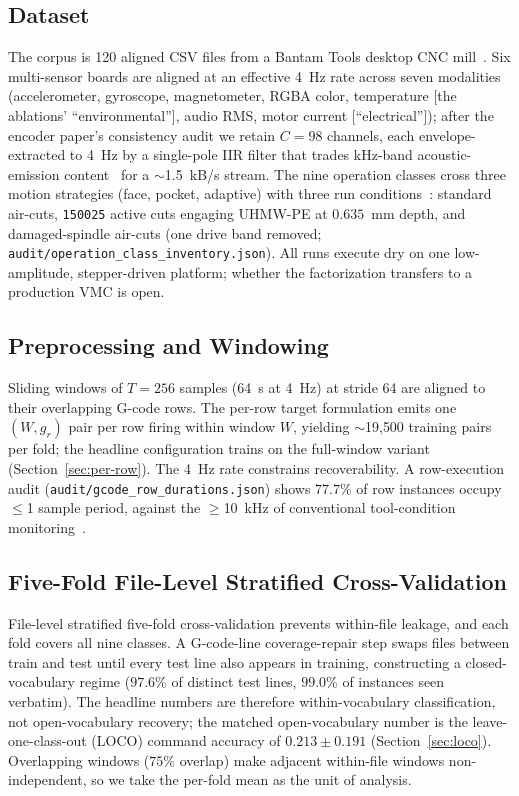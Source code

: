 \documentclass[conference]{IEEEtran}
\begin{document}
\subsection{Dataset}
\label{sec:dataset}

The corpus is 120 aligned CSV files from a Bantam Tools desktop CNC mill~\cite{encoder_paper}. Six multi-sensor boards are aligned at an effective 4~Hz rate across seven modalities (accelerometer, gyroscope, magnetometer, RGBA color, temperature [the ablations' ``environmental''], audio RMS, motor current [``electrical'']); after the encoder paper's consistency audit we retain $C=98$ channels, each envelope-extracted to 4~Hz by a single-pole IIR filter that trades kHz-band acoustic-emission content~\cite{teti2010advanced} for a $\sim$1.5~kB/s stream. The nine operation classes cross three motion strategies (face, pocket, adaptive) with three run conditions~\cite{encoder_paper}: standard air-cuts, \texttt{150025} active cuts engaging UHMW-PE at $0.635$~mm depth, and damaged-spindle air-cuts (one drive band removed; \texttt{audit/operation\_class\_inventory.json}). All runs execute dry on one low-amplitude, stepper-driven platform; whether the factorization transfers to a production VMC is open.

\subsection{Preprocessing and Windowing}
\label{sec:preprocessing}

Sliding windows of $T=256$ samples (64~s at 4~Hz) at stride 64 are aligned to their overlapping G-code rows. The per-row target formulation emits one $(W, g_r)$ pair per row firing within window $W$, yielding $\sim$19{,}500 training pairs per fold; the headline configuration trains on the full-window variant (Section~\ref{sec:per-row}). The 4~Hz rate constrains recoverability. A row-execution audit (\texttt{audit/gcode\_row\_durations.json}) shows $77.7\%$ of row instances occupy $\le$1 sample period, against the $\geq$10~kHz of conventional tool-condition monitoring~\cite{teti2010advanced}.

\subsection{Five-Fold File-Level Stratified Cross-Validation}
\label{sec:cv}

File-level stratified five-fold cross-validation prevents within-file leakage, and each fold covers all nine classes. A G-code-line coverage-repair step swaps files between train and test until every test line also appears in training, constructing a closed-vocabulary regime ($97.6\%$ of distinct test lines, $99.0\%$ of instances seen verbatim). The headline numbers are therefore within-vocabulary classification, not open-vocabulary recovery; the matched open-vocabulary number is the leave-one-class-out (LOCO) command accuracy of $0.213 \pm 0.191$ (Section~\ref{sec:loco}). Overlapping windows ($75\%$ overlap) make adjacent within-file windows non-independent, so we take the per-fold mean as the unit of analysis.
\end{document}
